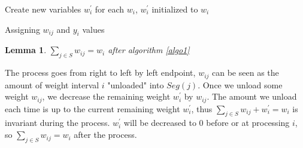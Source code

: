 \documentclass[preprint,12pt,authoryear]{elsarticle}
\newtheorem{lemma}[theorem]{Lemma}
\newenvironment{proof}[1][Proof]{\begin{trivlist}
\item[\hskip \labelsep {\bfseries #1}]}{\end{trivlist}}
\begin{document}
\begin{algorithm}[!htp]
\label{algo1}
 Create new variables $w^{'}_i$ for each $w_i$, $w^{'}_i$ initialized to $w_i$\\
 
 \caption{Assigning $w_{ij}$ and $y_i$ values}
\end{algorithm}

\begin{lemma}
$\sum\limits_{j \in S} w_{ij} = w_{i}$ after algorithm \ref{algo1}
\end{lemma}
\begin{proof}
The process goes from right to left by left endpoint, $w_{ij}$ can be seen as the amount of weight interval $i$ "unloaded" into $Seg(j)$. Once we unload some weight $w_{ij}$, we decrease the remaining weight $w^{'}_i$ by $w_{ij}$. The amount we unload each time is up to the current remaining weight $w^{'}_i$, thus $\sum\limits_{j \in S} w_{ij} + w_{i}^{'}= w_{i}$ is invariant during the process. $w^{'}_i$ will be decreased to 0 before or at processing $i$, so $\sum\limits_{j \in S} w_{ij} = w_{i}$ after the process.\\
\end{proof}
\end{document}
